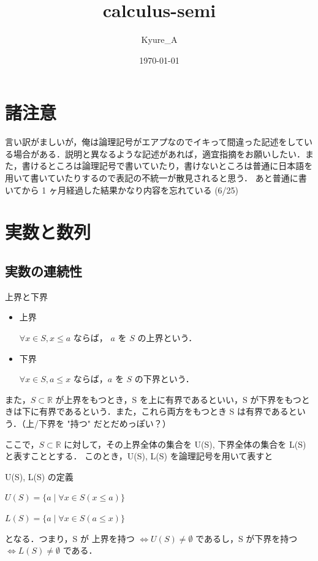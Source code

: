 \documentclass[xelatex,ja=standard,jafont=noto]{bxjsarticle}
\title{calculus-semi}
\author{Kyure\_A}
\date{\today}
\begin{document}
 
 \maketitle

 \section*{諸注意}
 言い訳がましいが，俺は論理記号がエアプなのでイキって間違った記述をしている場合がある．説明と異なるような記述があれば，適宜指摘をお願いしたい．また，書けるところは論理記号で書いていたり，書けないところは普通に日本語を用いて書いていたりするので表記の不統一が散見されると思う．
 あと普通に書いてから 1 ヶ月経過した結果かなり内容を忘れている (6/25)

 \tableofcontents
 \clearpage

 \section{実数と数列}

  \subsection{実数の連続性}

  \begin{tcb}{上界と下界}{}
   \begin{itemize}
    \item 上界 

	  $\forall x \in S, x \leq a$ ならば， $a$ を $S$ の上界という．

    \item 下界 

	  $\forall x \in S, a \leq x$ ならば，$a$ を $S$ の下界という．

   \end{itemize}
  \end{tcb}
  
  また，$S \subset \mathbb{R}$ が上界をもつとき，S を上に有界であるといい，S が下界をもつときは下に有界であるという．また，これら両方をもつとき S は有界であるという．（上/下界を "持つ" だとだめっぽい？）

  ここで，$S \subset \mathbb{R}$ に対して，その上界全体の集合を U(S), 下界全体の集合を L(S) と表すこととする．
  このとき，U(S), L(S) を論理記号を用いて表すと
  \begin{tcb}{U(S), L(S) の定義}{}
   \centerline
   {$
   U(S) = \{a \mid \forall x \in S (x \leq a)\}
   $}
   \centerline
   {$
   L(S) = \{a \mid \forall x \in S (a \leq x)\}
   $}
  \end{tcb}
  となる．つまり，S が 上界を持つ $\Leftrightarrow U(S) \neq \emptyset$  であるし，S が下界を持つ $\Leftrightarrow L(S) \neq \emptyset$ である．
  
\end{document}
